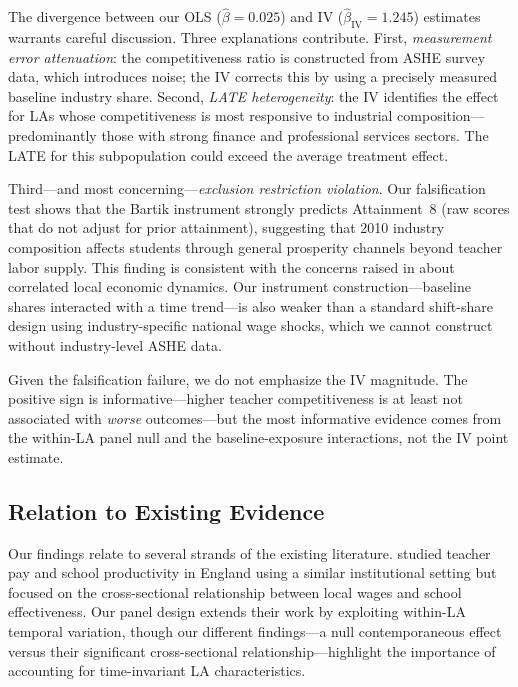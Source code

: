 \documentclass[12pt]{article}
\begin{document}
The divergence between our OLS ($\hat{\beta} = 0.025$) and IV ($\hat{\beta}_{\text{IV}} = 1.245$) estimates warrants careful discussion. Three explanations contribute. First, \textit{measurement error attenuation}: the competitiveness ratio is constructed from ASHE survey data, which introduces noise; the IV corrects this by using a precisely measured baseline industry share. Second, \textit{LATE heterogeneity}: the IV identifies the effect for LAs whose competitiveness is most responsive to industrial composition---predominantly those with strong finance and professional services sectors. The LATE for this subpopulation could exceed the average treatment effect.

Third---and most concerning---\textit{exclusion restriction violation}. Our falsification test shows that the Bartik instrument strongly predicts Attainment~8 (raw scores that do not adjust for prior attainment), suggesting that 2010 industry composition affects students through general prosperity channels beyond teacher labor supply. This finding is consistent with the concerns raised in \citet{goldsmith2020bartik} about correlated local economic dynamics. Our instrument construction---baseline shares interacted with a time trend---is also weaker than a standard shift-share design using industry-specific national wage shocks, which we cannot construct without industry-level ASHE data.

Given the falsification failure, we do not emphasize the IV magnitude. The positive sign is informative---higher teacher competitiveness is at least not associated with \textit{worse} outcomes---but the most informative evidence comes from the within-LA panel null and the baseline-exposure interactions, not the IV point estimate.

\subsection{Relation to Existing Evidence}

Our findings relate to several strands of the existing literature. \citet{britton2016teacher} studied teacher pay and school productivity in England using a similar institutional setting but focused on the cross-sectional relationship between local wages and school effectiveness. Our panel design extends their work by exploiting within-LA temporal variation, though our different findings---a null contemporaneous effect versus their significant cross-sectional relationship---highlight the importance of accounting for time-invariant LA characteristics.
\end{document}
